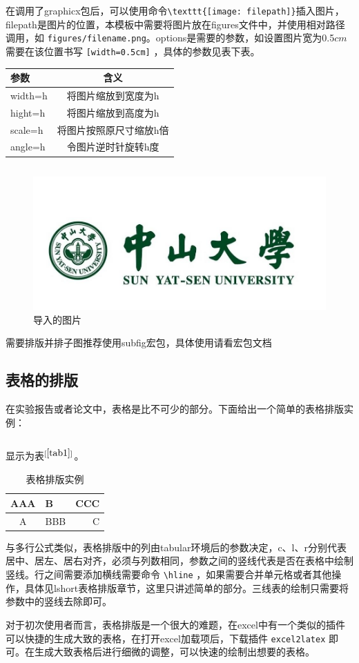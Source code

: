 在调用了graphicx包后，可以使用命令\verb|\texttt{[image: filepath]}|插入图片，filepath是图片的位置，本模板中需要将图片放在figures文件中，并使用相对路径调用，如 \verb|figures/filename.png|。options是需要的参数，如设置图片宽为0.5$cm$需要在该位置书写 \verb|[width=0.5cm]| ，具体的参数见表下表。
\begin{table}[h]
\centering
\begin{tabular}{lc}
\hline
参数&含义\\
\hline
width=h&将图片缩放到宽度为h\\
hight=h&将图片缩放到高度为h\\
scale=h&将图片按照原尺寸缩放h倍\\
angle=h&令图片逆时针旋转h度\\
\hline
\end{tabular}
\label{table1}
\end{table}

\inputminted[linenos,frame=lines]{latex}{code/figure2.tex}
\begin{figure}[h]
\centering
\includegraphics[scale = 0.5]{figures/sysu.jpeg}
\caption{导入的图片}
\label{fig1}
\end{figure}
需要排版并排子图推荐使用subfig宏包，具体使用请看宏包文档
\subsection{表格的排版}
在实验报告或者论文中，表格是比不可少的部分。下面给出一个简单的表格排版实例：
\inputminted[linenos,frame=lines]{latex}{code/table.tex}

显示为表$^{[\ref{tab1}]}$。
\begin{table}[h]
\centering
\caption{表格排版实例}
\label{tab1}
\begin{tabular}{|c|l|r|}
\hline
AAA&B&CCC\\
\hline
A&BBB&C\\
\hline
\end{tabular}
\end{table}
与多行公式类似，表格排版中的列由tabular环境后的参数决定，c、l、r分别代表居中、居左、居右对齐，必须与列数相同，参数之间的竖线代表是否在表格中绘制竖线。行之间需要添加横线需要命令 \verb|\hline| ，如果需要合并单元格或者其他操作，具体见lshort表格排版章节，这里只讲述简单的部分。三线表的绘制只需要将参数中的竖线去除即可。

对于初次使用者而言，表格排版是一个很大的难题，在excel中有一个类似的插件可以快捷的生成大致的表格，在打开excel加载项后，下载插件 \verb|excel2latex| 即可。在生成大致表格后进行细微的调整，可以快速的绘制出想要的表格。